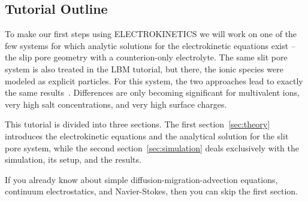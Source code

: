 \subsection*{Tutorial Outline}

To make our first steps using ELECTROKINETICS we will work on one of the few systems for which analytic solutions for the electrokinetic equations exist -- the slip pore geometry with a counterion-only electrolyte. The same slit pore system is also treated in the LBM tutorial, but there, the ionic species were modeled as explicit particles. For this system, the two approaches lead to exactly the same results~\cite{rempfer10a}. Differences are only becoming significant for multivalent ions, very high salt concentrations, and very high surface charges.

This tutorial is divided into three sections. The first section~\ref{sec:theory} introduces the electrokinetic equations and the analytical solution for the slit pore system, while the second section~\ref{sec:simulation} deals exclusively with the simulation, its setup, and the results.

If you already know about simple diffusion-migration-advection equations, continuum electrostatics, and Navier-Stokes, then you can skip the first section.

\pagebreak
